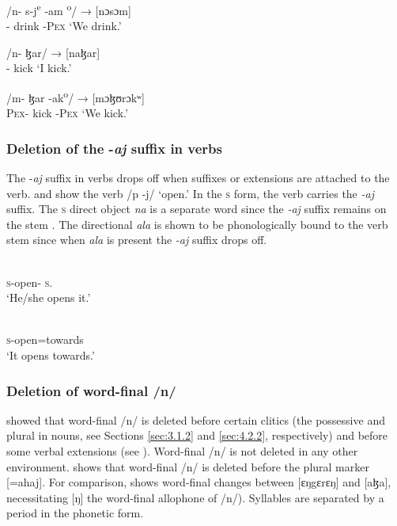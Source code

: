 \ea \label{ex:2:77}
\gll /n- {s-j\textsuperscript{e}} {-am \textsuperscript{o}/} \hspace{1.5pt} →  [nɔsɔm]\\
     {\oneS}- drink -\textsc{Pex} {} {} {‘We drink.’}\\
\z

\ea \label{ex:2:78}
\gll /n- ɮar/ \hspace{37pt}  →  [naɮar] \\
{\oneS}- kick {} {} {‘I kick.’}\\
\z

\ea \label{ex:2:79}
\gll /m-                            ɮar    {-ak\textsuperscript{o}/}   →  [mɔɮʊrɔkʷ]\\
     \textsc{Pex}-  kick   -\textsc{Pex}  {} {‘We kick.’}\\
\z

\subsubsection{Deletion of the -\textit{aj} suffix in verbs}\label{sec:2.6.1.4}
The -\textit{aj} suffix in verbs drops off when suffixes or extensions are attached to the verb.   and  show the verb /p -j/ ‘open.’ In the \textsc{s} form, the verb carries the \textit{{}-aj} suffix. The \textsc{s} direct object\textit{ na }is a separate word since the \textit{{}-aj} suffix remains on the stem . The directional \textit{ala} is shown to be phonologically bound to the verb stem since when \textit{ala} is present  the \textit{{}-aj} suffix drops off.

\ea \label{ex:2:80}
\gll   [a-p-aj                                na]\\
      \textsc{s}-open-{\CL}  \textsc{s}.{\DO}\\
\glt  ‘He/she opens it.’
\z

\ea \label{ex:2:81}
\gll  [a-p=ala]\\
      \textsc{s}-open=towards\\
\glt  ‘It opens towards.’
\z

\subsubsection{Deletion of word-final /n/}\label{sec:2.6.1.5}

\citet{Bow1997c} showed that word-final /n/ is deleted before certain clitics (the possessive and plural in nouns, see Sections \ref{sec:3.1.2} and \ref{sec:4.2.2}, respectively) and before some verbal extensions (see ). Word-final /n/ is not deleted in any other environment.  shows that word-final /n/ is deleted before the plural marker [=ahaj]. For comparison,  shows word-final changes between [ɛŋgɛrɛŋ] and [aɮa], necessitating [ŋ] the word-final allophone of /n/). Syllables are separated by a period in the phonetic form.

